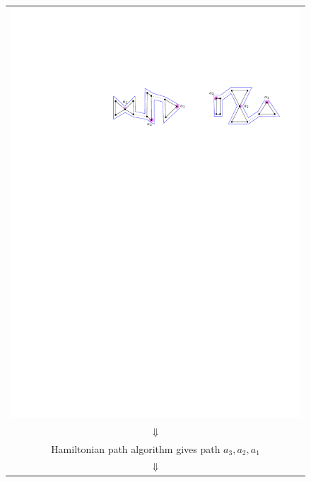 \documentclass[11pt]{patmorin}
\begin{document}
\begin{figure}
\begin{center}
\begin{tabular}{c}
     \includegraphics{img/example-3} \\[2ex]
     $\Downarrow$ \\
     Hamiltonian path algorithm gives path $a_3,a_2,a_1$ \\[2ex]
     $\Downarrow$ \\

\end{tabular}
\end{center}
\end{figure}
\end{document}
